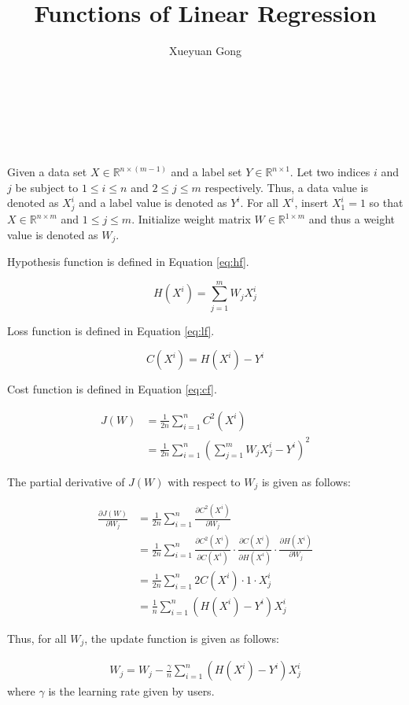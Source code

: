 \documentclass{sig-alternate}
\begin{document}
\title{Functions of Linear Regression}

\author{
	\alignauthor
	Xueyuan Gong\\
	\\
	\\
    \\
    \\
}

\maketitle

Given a data set $X\in \mathbb{R}^{n\times (m-1)}$ and a label set $Y\in \mathbb{R}^{n\times 1}$. Let two indices $i$ and $j$ be subject to $1\leq i\leq n$ and $2\leq j \leq m$ respectively. Thus, a data value is denoted as $X^{i}_{j}$ and a label value is denoted as $Y^{i}$. For all $X^{i}$, insert $X^{i}_{1}=1$ so that $X\in \mathbb{R}^{n\times m}$ and $1\leq j \leq m$. Initialize weight matrix $W\in \mathbb{R}^{1\times m}$ and thus a weight value is denoted as $W_{j}$.

Hypothesis function is defined in Equation \eqref{eq:hf}.

\begin{equation}
\label{eq:hf}
	H(X^{i})=\sum_{j=1}^{m}W_{j}X^{i}_{j}
\end{equation}

Loss function is defined in Equation \eqref{eq:lf}.

\begin{equation}
\label{eq:lf}
	C(X^{i})=H(X^{i})-Y^{i}
\end{equation}

Cost function is defined in Equation \eqref{eq:cf}.

\begin{equation}
\label{eq:cf}
	\begin{aligned}
	J(W)&=\frac{1}{2n}\sum_{i=1}^{n}C^2(X^{i})\\
		&=\frac{1}{2n}\sum_{i=1}^{n}(\sum_{j=1}^{m}W_{j}X^{i}_{j}-Y^{i})^{2}
	\end{aligned}
\end{equation}

The partial derivative of $J(W)$ with respect to $W_{j}$ is given as follows:

\begin{align*}
	\frac{\partial{J(W)}}{\partial{W_{j}}}
	&=\frac{1}{2n}\sum_{i=1}^{n}\frac{\partial{C^2(X^{i})}}{\partial{W_{j}}}\\
	&=\frac{1}{2n}\sum_{i=1}^{n}\frac{\partial{C^2(X^{i})}}{\partial{C(X^{i})}}\cdot \frac{\partial{C(X^{i})}}{\partial{H(X^{i})}}\cdot \frac{\partial{H(X^{i})}}{\partial{W_{j}}}\\
	&=\frac{1}{2n}\sum_{i=1}^{n}2C(X^{i})\cdot 1\cdot X^{i}_{j}\\
	&=\frac{1}{n}\sum_{i=1}^{n}(H(X^{i})-Y^{i})X^{i}_{j}
\end{align*}

Thus, for all $W_{j}$, the update function is given as follows:

\begin{align*}
	W_{j}=W_{j}-\frac{\gamma}{n}\sum_{i=1}^{n}(H(X^{i})-Y^{i})X^{i}_{j}
\end{align*}
where $\gamma$ is the learning rate given by users.
\end{document}
